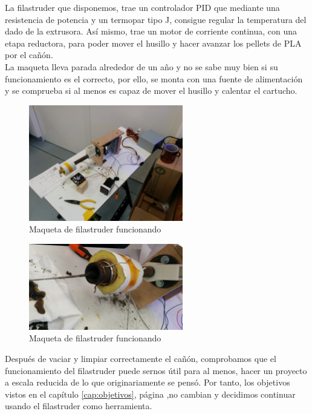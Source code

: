 La filastruder que disponemos, trae un controlador PID que mediante una resistencia de potencia y un termopar tipo J, consigue regular la temperatura del dado de la extrusora. Así mismo, trae un motor de corriente continua, con una etapa reductora, para poder mover el husillo y hacer avanzar los pellets de PLA por el cañón.\\

La maqueta lleva parada alrededor de un año y no se sabe muy bien si su funcionamiento es el correcto, por ello, se monta con una fuente de alimentación y se comprueba si al menos es capaz de mover el husillo y calentar el cartucho.\\

	\begin{figure}[H]
            \centering
            \includegraphics[width=0.6\textwidth]{images/filaextruder/IMG_20150225_093400.jpg}
            \caption{Maqueta de filastruder funcionando}
            \label{fig:hardware_filastruder2}
    \end{figure}
    	\begin{figure}[H]
            \centering
            \includegraphics[width=0.6\textwidth]{images/filaextruder/IMG_20150225_124525.jpg}
            \caption{Maqueta de filastruder funcionando}
            \label{fig:hardware_filastruder3}
    \end{figure}

Después de vaciar y limpiar correctamente el cañón, comprobamos que el funcionamiento del filastruder puede sernos útil para al menos, hacer un proyecto a escala reducida de lo que originariamente se pensó. Por tanto, los objetivos vistos en el capítulo \ref{cap:objetivos}, página \pageref{cap:objetivos},no cambian y decidimos continuar usando el filastruder como herramienta.\\

